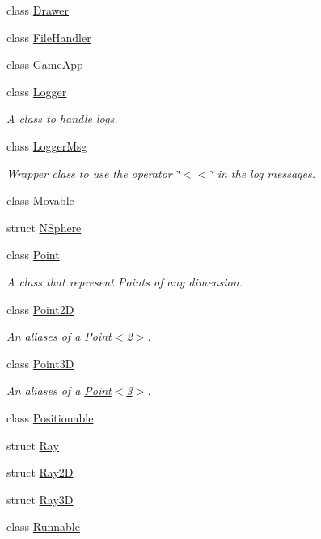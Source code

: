 \begin{DoxyCompactItemize}
\item 
class \hyperlink{classzbe_1_1_drawer}{Drawer}
\item 
class \hyperlink{classzbe_1_1_file_handler}{File\+Handler}
\item 
class \hyperlink{classzbe_1_1_game_app}{Game\+App}
\item 
class \hyperlink{classzbe_1_1_logger}{Logger}
\begin{DoxyCompactList}\small\item\em A class to handle logs. \end{DoxyCompactList}\item 
class \hyperlink{classzbe_1_1_logger_msg}{Logger\+Msg}
\begin{DoxyCompactList}\small\item\em Wrapper class to use the operator \char`\"{}$<$$<$\char`\"{} in the log messages. \end{DoxyCompactList}\item 
class \hyperlink{classzbe_1_1_movable}{Movable}
\item 
struct \hyperlink{structzbe_1_1_n_sphere}{N\+Sphere}
\item 
class \hyperlink{classzbe_1_1_point}{Point}
\begin{DoxyCompactList}\small\item\em A class that represent Points of any dimension. \end{DoxyCompactList}\item 
class \hyperlink{classzbe_1_1_point2_d}{Point2\+D}
\begin{DoxyCompactList}\small\item\em An aliases of a \hyperlink{classzbe_1_1_point}{Point$<$2$>$}. \end{DoxyCompactList}\item 
class \hyperlink{classzbe_1_1_point3_d}{Point3\+D}
\begin{DoxyCompactList}\small\item\em An aliases of a \hyperlink{classzbe_1_1_point}{Point$<$3$>$}. \end{DoxyCompactList}\item 
class \hyperlink{classzbe_1_1_positionable}{Positionable}
\item 
struct \hyperlink{structzbe_1_1_ray}{Ray}
\item 
struct \hyperlink{structzbe_1_1_ray2_d}{Ray2\+D}
\item 
struct \hyperlink{structzbe_1_1_ray3_d}{Ray3\+D}
\item 
class \hyperlink{classzbe_1_1_runnable}{Runnable}

\end{DoxyCompactItemize}
